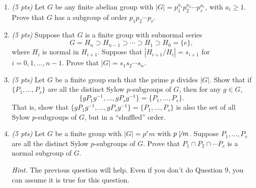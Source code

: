\begin{enumerate}[resume,label={\color{main}\sffamily\bfseries \arabic*.}]
	\item \textit{(5 pts)} Let $G$ be any finite abelian group with $|G|=p_1^{a_1}p_2^{a_2}\cdots p_r^{a_r}$, with $a_i\geq 1$. Prove that $G$ has a subgroup of order $p_1p_2\cdots p_r$.
	\item \textit{(5 pts)} Suppose that $G$ is a finite group with subnormal series
	$$G=H_n\supset H_{n-1}\supset\cdots\supset H_1\supset H_0=\{e\},$$
	where $H_i$ is normal in $H_{i+1}$. Suppose that $|H_{i+1}/H_i|=s_{i+1}$ for $i=0,1,\hdots,n-1$. Prove that $|G|=s_1s_2\cdots s_n$.
	\item \textit{(5 pts)} Let $G$ be a finite group such that the prime $p$ divides $|G|$. Show that if $\{P_1,\hdots, P_s\}$ are all the distinct Sylow $p$-subgroups of $G$, then for any $g\in G$,
	$$\{gP_1g^{-1},\hdots,gP_sg^{-1}\}=\{P_1,\hdots, P_s\}.$$
	That is, show that $\{gP_1g^{-1},\hdots,gP_sg^{-1}\}=\{P_1,\hdots, P_s\}$ is also the set of all Sylow $p$-subgroups of $G$, but in a ``shuffled'' order.
	\item \textit{(5 pts)} Let $G$ be a finite group with $|G|=p^rm$ with $p\not\mid m$. Suppose $P_1,\hdots,P_s$ are all the distinct Sylow $p$-subgroups of $G$. Prove that $P_1\cap P_2\cap\cdots P_s$ is a normal subgroup of $G$.

	\textit{Hint.} The previous question will help. Even if you don't do Question 9, you can assume it is true for this question.
\end{enumerate}